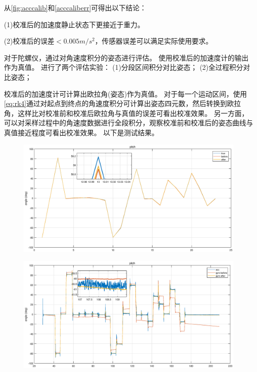 \documentclass[
  type=master
]{gdutthesis}
\begin{document}
从\autoref{fig:acccalib}和\autoref{acccaliberr}可得出以下结论：

(1)校准后的加速度静止状态下更接近于重力。

(2)校准后的误差$<0.005m/s^2$，传感器误差可以满足实际使用要求。

对于陀螺仪，通过对角速度积分的姿态进行评估。
使用校准后的加速度计的输出作为真值。
进行了两个评估实验：
(1)分段区间积分对比姿态；
(2)全过程积分对比姿态；

校准后的加速度计可计算出欧拉角(姿态)作为真值。
对于每一个运动区间，使用\autoref{eq:rk4}通过对起点到终点的角速度积分可计算出姿态四元数，然后转换到欧拉角，这样比对校准前和校准后欧拉角与真值的误差可看出校准效果。
另一方面，可以对采样过程中的角速度数据进行全段积分，观察校准前和校准后的姿态曲线与真值接近程度可看出校准效果。
以下是测试结果。

\begin{figure}[H]
	\centering
	\includegraphics[width=1.0\textwidth]{piece.eps}
	\label{fig:piece}
\end{figure}

\begin{figure}[H]
	\centering
	\includegraphics[width=1.0\textwidth]{full.eps}
	\label{fig:full}
\end{figure}
\end{document}
